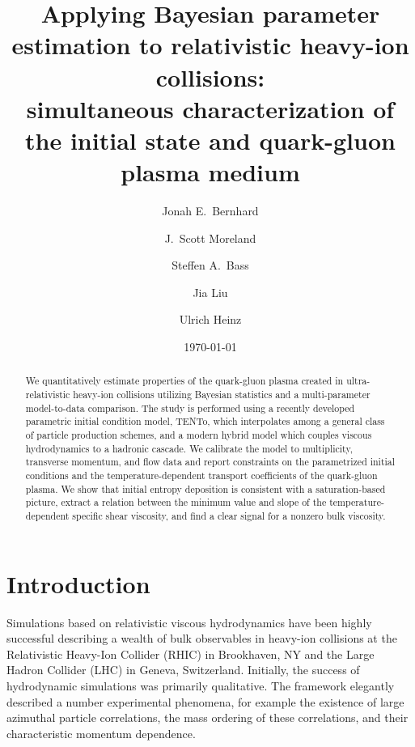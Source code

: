\documentclass[aps,prc,reprint,amsmath,nofootinbib,noeprint]{revtex4-1}
\newcommand{\trento}{T\raisebox{-0.5ex}{R}ENTo}
\begin{document}
\title{
  Applying Bayesian parameter estimation to relativistic heavy-ion collisions: \\
  simultaneous characterization of the initial state and quark-gluon plasma medium
}

\author{Jonah E.\ Bernhard}
\author{J.\ Scott Moreland}
\author{Steffen A.\ Bass}

\author{Jia Liu}
\author{Ulrich Heinz}

\date{\today}

\begin{abstract}
  We quantitatively estimate properties of the quark-gluon plasma created in ultra-relativistic heavy-ion collisions utilizing Bayesian statistics and a multi-parameter model-to-data comparison.
  The study is performed using a recently developed parametric initial condition model, \trento, which interpolates among a general class of particle production schemes, and a modern hybrid model which couples viscous hydrodynamics to a hadronic cascade.
  We calibrate the model to multiplicity, transverse momentum, and flow data and report constraints on the parametrized initial conditions and the temperature-dependent transport coefficients of the quark-gluon plasma.
  We show that initial entropy deposition is consistent with a saturation-based picture, extract a relation between the minimum value and slope of the temperature-dependent specific shear viscosity, and find a clear signal for a nonzero bulk viscosity.
\end{abstract}

\maketitle


\section{Introduction}

Simulations based on relativistic viscous hydrodynamics have been highly successful describing a wealth of bulk observables in heavy-ion collisions at the Relativistic Heavy-Ion Collider (RHIC) in Brookhaven, NY and the Large Hadron Collider (LHC) in Geneva, Switzerland.
Initially, the success of hydrodynamic simulations was primarily qualitative.
The framework elegantly described a number experimental phenomena, for example the existence of large azimuthal particle correlations, the mass ordering of these correlations, and their characteristic momentum dependence.
\end{document}
